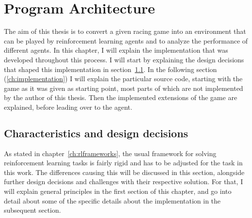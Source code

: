 \chapter{Program Architecture}

\label{ch:program}

\newcommand{\term}[1] {{\spaceskip=.95\fontdimen2\font minus \fontdimen4\font
	\xspaceskip=0pt\relax \large\texttt{#1}}}

\renewcommand{\inlinecode}[1]{\colorbox{red}{\lstinline[basicstyle=\ttfamily\color{black}]{#1}}}


\newcommand{\codefunc}[1]{\colorbox{evenmorelightgray}{\lstinline[basicstyle=\ttfamily\color{black},keywordstyle=\ttfamily]{#1}}}

\newcommand{\codeobj}[1]{\colorbox{evenmorelightgray}{{\spaceskip=.95\fontdimen2\font minus \fontdimen4\font	\xspaceskip=0pt\relax \large\texttt{#1}}}}

\newcommand{\codeobjFN}[1]{\colorbox{evenmorelightgray}{{\spaceskip=.95\fontdimen2\font minus \fontdimen4\font	\xspaceskip=0pt\relax \texttt{#1}}}}

\newcommand{\codeother}[1]{\colorbox{evenmorelightgray}{\lstinline[basicstyle=\ttfamily\color{black},keywordstyle=\ttfamily]{#1}}}


\newcommand{\filename}[1] {{\spaceskip=.95\fontdimen2\font minus \fontdimen4\font
		\xspaceskip=0pt\relax \large\texttt{#1}}}


The aim of this thesis is to convert a given racing game into an environment that can be played by reinforcement learning agents and to analyze the performance of different agents. In this chapter, I will explain the implementation that was developed throughout this process. I will start by explaining the design decisions that shaped this implementation in section~\ref{ch:projectcharacteristicschap}. In the following section (\ref{ch:implementation}) I will explain the particular source code, starting with the game as it was given as starting point, most parts of which are not implemented by the author of this thesis. Then the implemented extensions of the game are explained, before leading over to the agent. 

\section{Characteristics and design decisions}

\label{ch:projectcharacteristicschap}

As stated in chapter~\ref{ch:rlframeworks}, the usual framework for solving reinforcement learning tasks is fairly rigid and has to be adjusted for the task in this work. The differences causing this will be discussed in this section, alongside further design decisions and challenges with their respective solution. For that, I will explain general principles in the first section of this chapter, and go into detail about some of the specific details about the implementation in the subsequent section.

